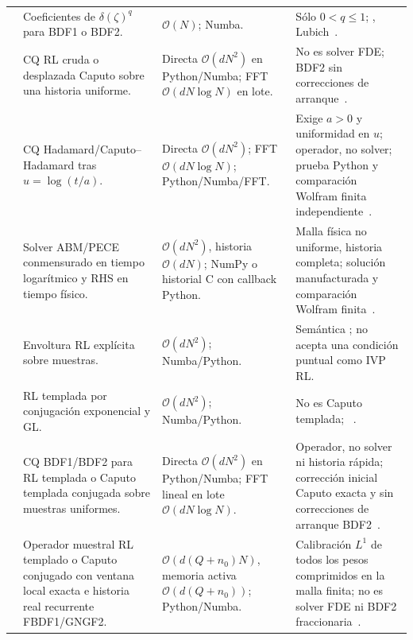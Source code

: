 \begin{center}
\begin{longtable}{@{}L{0.23\textwidth}L{0.23\textwidth}L{0.23\textwidth}L{0.23\textwidth}@{}}
\addlinespace
{} & Coeficientes de \(\delta(\zeta)^q\) para BDF1 o BDF2. & \(\mathcal O(N)\); Numba. & Sólo \(0<q\le1\); , Lubich~\cite{Lubich1986,Lubich2004}. \\
\addlinespace
{} & CQ RL cruda o desplazada Caputo sobre una historia uniforme. & Directa \(\mathcal O(dN^2)\) en Python/Numba; FFT \(\mathcal O(dN\log N)\) en lote. & No es solver FDE; BDF2 sin correcciones de arranque~\cite{JinLiZhou2017}. \\
\addlinespace
{} & CQ Hadamard/Caputo--Hadamard tras \(u=\log(t/a)\). & Directa \(\mathcal O(dN^2)\); FFT \(\mathcal O(dN\log N)\); Python/Numba/FFT. & Exige \(a>0\) y uniformidad en \(u\); operador, no solver; prueba Python y comparación Wolfram finita independiente~\cite{JaradEtAl2012,YinEtAl2024}. \\
\addlinespace
{} & Solver ABM/PECE conmensurado en tiempo logarítmico y RHS en tiempo físico. & \(\mathcal O(dN^2)\), historia \(\mathcal O(dN)\); NumPy o historial C con callback Python. & Malla física no uniforme, historia completa; solución manufacturada y comparación Wolfram finita~\cite{Zheng2021,GreenLiuYan2021}. \\
\addlinespace
{} & Envoltura RL explícita sobre muestras. & \(\mathcal O(dN^2)\); Numba/Python. & Semántica ; no acepta una condición puntual como IVP RL. \\
\addlinespace
{} & RL templada por conjugación exponencial y GL. & \(\mathcal O(dN^2)\); Numba/Python. & No es Caputo templada; ~\cite{SabzikarEtAl2015}. \\
\addlinespace
{} & CQ BDF1/BDF2 para RL templada o Caputo templada conjugada sobre muestras uniformes. & Directa \(\mathcal O(dN^2)\) en Python/Numba; FFT lineal en lote \(\mathcal O(dN\log N)\). & Operador, no solver ni historia rápida; corrección inicial Caputo exacta y sin correcciones de arranque BDF2~\cite{ChenDeng2015,GuoEtAl2019Tempered,JinLiZhou2017}. \\
\addlinespace
{} & Operador muestral RL templado o Caputo conjugado con ventana local exacta e historia real recurrente FBDF1/GNGF2. & \(\mathcal O(d(Q+n_0)N)\), memoria activa \(\mathcal O(d(Q+n_0))\); Python/Numba. & Calibración \(L^1\) de todos los pesos comprimidos en la malla finita; no es solver FDE ni BDF2 fraccionaria~\cite{GuoEtAl2019Tempered,Lubich1986}. \\

\end{longtable}
\end{center}
